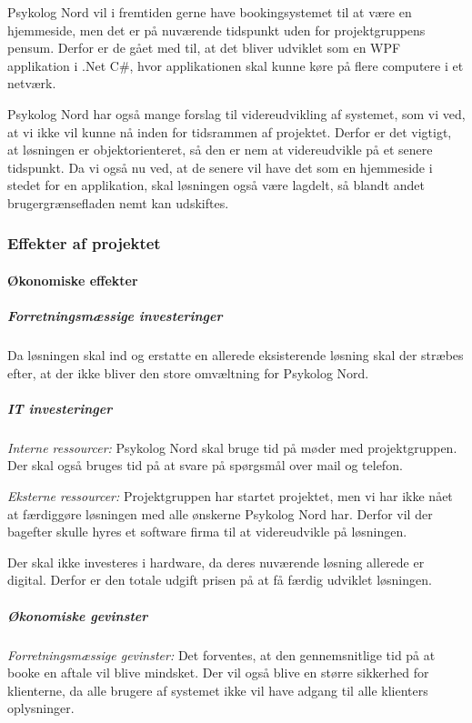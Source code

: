Psykolog Nord vil i fremtiden gerne have bookingsystemet til at være en hjemmeside, men det er på nuværende tidspunkt uden for projektgruppens pensum.
Derfor er de gået med til, at det bliver udviklet som en WPF applikation i .Net C\#, hvor applikationen skal kunne køre på flere computere i et netværk.

Psykolog Nord har også mange forslag til videreudvikling af systemet, som vi ved, at vi ikke vil kunne nå inden for tidsrammen af projektet.
Derfor er det vigtigt, at løsningen er objektorienteret, så den er nem at videreudvikle på et senere tidspunkt.
Da vi også nu ved, at de senere vil have det som en hjemmeside i stedet for en applikation, skal løsningen også være lagdelt, så blandt andet brugergrænsefladen nemt kan udskiftes.

\subsubsection{Effekter af projektet}
\paragraph*{Økonomiske effekter}
\subparagraph*{Forretningsmæssige investeringer}

Da løsningen skal ind og erstatte en allerede eksisterende løsning skal der stræbes efter, at der ikke bliver den store omvæltning for Psykolog Nord.

\subparagraph{IT investeringer}

\textit{Interne ressourcer:} Psykolog Nord skal bruge tid på møder med projektgruppen. Der skal også bruges tid på at svare på spørgsmål over mail og telefon.

\textit{Eksterne ressourcer:} Projektgruppen har startet projektet, men vi har ikke nået at færdiggøre løsningen med alle ønskerne Psykolog Nord har.
Derfor vil der bagefter skulle hyres et software firma til at videreudvikle på løsningen.

Der skal ikke investeres i hardware, da deres nuværende løsning allerede er digital. Derfor er den totale udgift prisen på at få færdig udviklet løsningen.

\subparagraph{Økonomiske gevinster}

\textit{Forretningsmæssige gevinster:} Det forventes, at den gennemsnitlige tid på at booke en aftale vil blive mindsket.
Der vil også blive en større sikkerhed for klienterne, da alle brugere af systemet ikke vil have adgang til alle klienters oplysninger.

